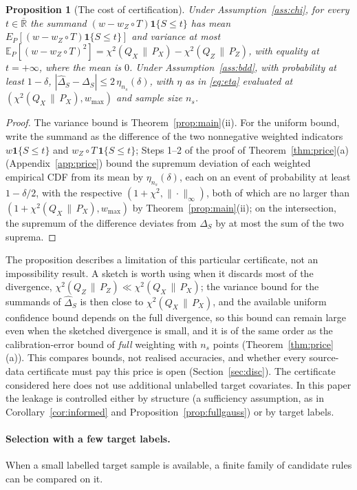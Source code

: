 \documentclass[11pt,a4paper]{article}
\newcommand{\PX}{P_X}
\newcommand{\QX}{Q_X}
\newcommand{\chisq}{\chi^2(\QX\,\|\,\PX)}
\newcommand{\chisqZ}{\chi^2(Q_Z\,\|\,P_Z)}
\newcommand{\E}{\mathbb{E}}
\newcommand{\Rbar}{\overline{\mathbb{R}}}
\newcommand{\ind}{\mathbf 1}
\theoremstyle{plain}
\newtheorem{proposition}[theorem]{Proposition}
\theoremstyle{definition}
\theoremstyle{remark}
\begin{document}
\begin{proposition}[The cost of certification]\label{prop:certify}
Under Assumption~\ref{ass:chi}, for every $t\in\Rbar$ the summand $(w-w_Z\circ T)\ind\{S\le t\}$ has mean $E_P[(w-w_Z\circ T)\ind\{S\le t\}]$ and variance at most $\E_P[(w-w_Z\circ T)^2]=\chisq-\chisqZ$, with equality at $t=+\infty$, where the mean is $0$. Under Assumption~\ref{ass:bdd}, with probability at least $1-\delta$,
$|\widehat\Delta_S-\Delta_S|\le2\,\eta_{n_s}(\delta)$, with $\eta$ as in \eqref{eq:eta} evaluated at $(\chisq,w_{\max})$ and sample size $n_s$.
\end{proposition}
\begin{proof}
The variance bound is Theorem~\ref{prop:main}(ii). For the uniform bound, write the summand as the difference of the two nonnegative weighted indicators $w\ind\{S\le t\}$ and $w_Z\circ T\,\ind\{S\le t\}$; Steps 1--2 of the proof of Theorem~\ref{thm:price}(a) (Appendix~\ref{app:price}) bound the supremum deviation of each weighted empirical CDF from its mean by $\eta_{n_s}(\delta)$, each on an event of probability at least $1-\delta/2$, with the respective $(1+\chi^2,\|\cdot\|_\infty)$, both of which are no larger than $(1+\chisq,w_{\max})$ by Theorem~\ref{prop:main}(ii); on the intersection, the supremum of the difference deviates from $\Delta_S$ by at most the sum of the two suprema.
\end{proof}

The proposition describes a limitation of this particular certificate, not an impossibility result. A sketch is worth using when it discards most of the divergence, $\chisqZ\ll\chisq$; the variance bound for the summands of $\widehat\Delta_S$ is then close to $\chisq$, and the available uniform confidence bound depends on the full divergence, so this bound can remain large even when the sketched divergence is small, and it is of the same order as the calibration-error bound of \emph{full} weighting with $n_s$ points (Theorem~\ref{thm:price}(a)). This compares bounds, not realised accuracies, and whether every source-data certificate must pay this price is open (Section~\ref{sec:disc}). The certificate considered here does not use additional unlabelled target covariates. In this paper the leakage is controlled either by structure (a sufficiency assumption, as in Corollary~\ref{cor:informed} and Proposition~\ref{prop:fullgauss}) or by target labels.

\paragraph{Selection with a few target labels.}
When a small labelled target sample is available, a finite family of candidate rules can be compared on it.
\end{document}
